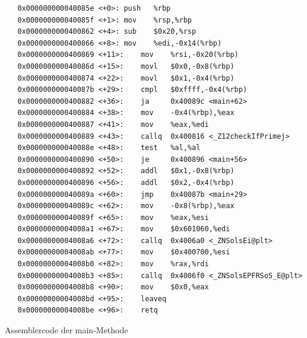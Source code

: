 \documentclass[a4paper,12pt]{article}
\begin{document}
\begin{code}
\begin{lstlisting}
   0x000000000040085e <+0>:	push   %rbp
   0x000000000040085f <+1>:	mov    %rsp,%rbp
   0x0000000000400862 <+4>:	sub    $0x20,%rsp
   0x0000000000400866 <+8>:	mov    %edi,-0x14(%rbp)
   0x0000000000400869 <+11>:	mov    %rsi,-0x20(%rbp)
   0x000000000040086d <+15>:	movl   $0x0,-0x8(%rbp)
   0x0000000000400874 <+22>:	movl   $0x1,-0x4(%rbp)
   0x000000000040087b <+29>:	cmpl   $0xffff,-0x4(%rbp)
   0x0000000000400882 <+36>:	ja     0x40089c <main+62>
   0x0000000000400884 <+38>:	mov    -0x4(%rbp),%eax
   0x0000000000400887 <+41>:	mov    %eax,%edi
   0x0000000000400889 <+43>:	callq  0x400816 <_Z12checkIfPrimej>
   0x000000000040088e <+48>:	test   %al,%al
   0x0000000000400890 <+50>:	je     0x400896 <main+56>
   0x0000000000400892 <+52>:	addl   $0x1,-0x8(%rbp)
   0x0000000000400896 <+56>:	addl   $0x2,-0x4(%rbp)
   0x000000000040089a <+60>:	jmp    0x40087b <main+29>
   0x000000000040089c <+62>:	mov    -0x8(%rbp),%eax
   0x000000000040089f <+65>:	mov    %eax,%esi
   0x00000000004008a1 <+67>:	mov    $0x601060,%edi
   0x00000000004008a6 <+72>:	callq  0x4006a0 <_ZNSolsEi@plt>
   0x00000000004008ab <+77>:	mov    $0x400700,%esi
   0x00000000004008b0 <+82>:	mov    %rax,%rdi
   0x00000000004008b3 <+85>:	callq  0x4006f0 <_ZNSolsEPFRSoS_E@plt>
   0x00000000004008b8 <+90>:	mov    $0x0,%eax
   0x00000000004008bd <+95>:	leaveq 
   0x00000000004008be <+96>:	retq   
\end{lstlisting}
\caption[Assemblercode der main Methode]{Assemblercode der main-Methode}
\end{code}
\end{document}

